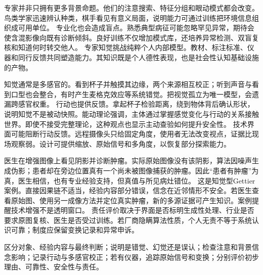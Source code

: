 专家并非只拥有更多背景命题。他们的注意搜索、特征分组和眼动模式都会改变。鸟类学家迅速辨认种类，棋手看见有意义局面，说明能力可通过训练把环境信息组织成可用单位。 专业化也会造成盲点。熟悉典型病征可能忽略罕见异常，期待会使含混影像向既有诊断倾斜。良好训练不仅增加模式库，还培养异常检测、双盲复核和知道何时转交他人。 专家知觉挑战纯粹个人内部模型。教材、标注标准、仪器和同行反馈共同塑造能力。其知识既是个人德性表现，也是社会性认知基础设施的产物。

知觉通常是多感官的。看到杯子并触摸其边缘，两个来源相互校正；听到声音与看到口型也会整合，有时产生麦格克效应等系统错觉。把视觉孤立为唯一模型，会遗漏跨感官权重。 行动也提供反馈。拿起杯子检验距离，绕到物体背后确认形状，说明知觉不是被动快照。能动理论强调，主体通过掌握感觉变化与行动的关系接触世界。即使不接受完整理论，这种观点也显示主动查验如何提升安全性。 技术界面可能阻断行动反馈。远程摄像头只给固定角度，使用者无法改变视点，证据比现场观察弱。设计可提供缩放、原始信号和多角度，以恢复部分探索能力。

医生在增强图像上看见阴影并诊断肿瘤。实际原始图像没有该阴影，算法因噪声生成伪影；患者却在旁边位置真有一个尚未被图像捕获的肿瘤。因此“患者有肿瘤”为真，医生相信，也有专业经验支持，但真值与所见病灶错位。 这是知觉型Gettier案例。直接因果链不适当，经验内容部分错误，信念在近邻情形不安全。若医生查看原始图、使用另一成像方法并定位真实肿瘤，新的多源证据可产生知识。案例提醒技术增强不是透明窗口。 责任评价取决于界面是否标明生成性处理、行业是否要求原图复核、医生是否受过训练。若厂商隐瞒算法性质，个人无责不等于系统认识可靠；制度应保留变换记录和异常申诉。

\begin{tcolorbox}[breakable,colback=white,colframe=blue!30!black,title={知觉案例分析表},fonttitle=\bfseries]
区分对象、经验内容与最终判断；说明是错觉、幻觉还是误认；检查注意和背景信念影响；记录行动与多感官校正；若有仪器，追踪原始信号和变换；分别评价初步理由、可靠性、安全性与责任。
\end{tcolorbox}
